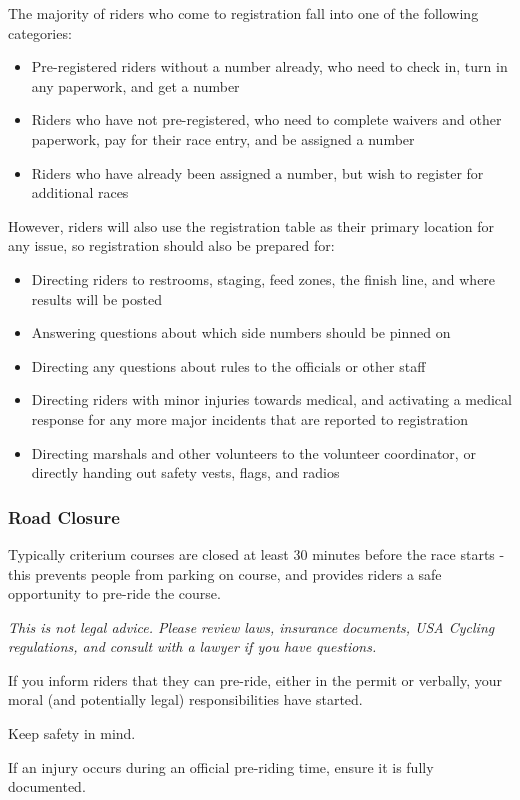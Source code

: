 \documentclass[
  letterpaper, %
  fontsize=10pt, %
  twoside=true,
  chapterentrydots=true, %
  numbers=noenddot,
  fontmethod=tex,
]{kaobook}
\begin{document}
The majority of riders who come to registration fall into one of the following categories:

\begin{itemize}
  \item Pre-registered riders without a number already,
        who need to check in, turn in any paperwork, and get a number
  \item Riders who have not pre-registered,
        who need to complete waivers and other paperwork,
        pay for their race entry,
        and be assigned a number
  \item Riders who have already been assigned a number,
        but wish to register for additional races
\end{itemize}


However, riders will also use the registration table as their primary location
for any issue, so registration should also be prepared for:

\begin{itemize}
  \item Directing riders to restrooms, staging, feed zones, the finish line, and where results will be posted
  \item Answering questions about which side numbers should be pinned on
  \item Directing any questions about rules to the officials or other staff
  \item Directing riders with minor injuries towards medical, and activating a medical response for any more major incidents that are reported to registration
  \item Directing marshals and other volunteers to the volunteer coordinator, or directly handing out safety vests, flags, and radios
\end{itemize}

\subsubsection{Road Closure}

Typically criterium courses are closed at least 30 minutes before the race starts - this prevents people from parking on course, and provides riders a safe opportunity to pre-ride the course.

\begin{kaobox}[title=Official Pre-Riding and Legal Liabilities]
\textit{This is not legal advice. Please review laws, insurance documents, USA Cycling regulations, and consult with a lawyer if you have questions.}

If you inform riders that they can pre-ride, either in the permit or verbally, your moral (and potentially legal) responsibilities have started.

Keep safety in mind.

If an injury occurs during an official pre-riding time,
ensure it is fully documented. %
\end{kaobox}
\end{document}
